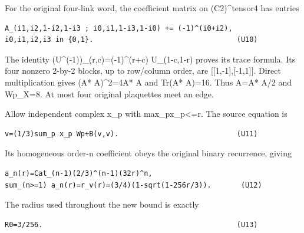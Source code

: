 \documentclass[11pt,a4paper]{article}
\renewcommand{\[}{\begingroup\small\originaldisplaystart}
\renewcommand{\]}{\originaldisplayend\endgroup}
\begin{document}
For the original four-link word, the coefficient matrix on
(C2)\^{}tensor4 has entries

\begin{verbatim}
A_(i1,i2,1-i2,1-i3 ; i0,i1,1-i3,1-i0) += (-1)^(i0+i2),
i0,i1,i2,i3 in {0,1}.                                  (U10)
\end{verbatim}

The identity
{(\allowbreak{}U\allowbreak{}\textasciicircum{}\allowbreak{}(\allowbreak{}-\allowbreak{}1\allowbreak{})\allowbreak{})\allowbreak{}\_\allowbreak{}(\allowbreak{}r\allowbreak{},\allowbreak{}c\allowbreak{})\allowbreak{}=\allowbreak{}(\allowbreak{}-\allowbreak{}1\allowbreak{})\allowbreak{}\textasciicircum{}\allowbreak{}(\allowbreak{}r\allowbreak{}+\allowbreak{}c\allowbreak{})\allowbreak{}}
U\_(1-c,1-r) proves its trace formula. Its four nonzero 2-by-2 blocks,
up to row/column order, are {[}{[}1,-1{]},{[}-1,1{]}{]}. Direct
multiplication gives (A* A)\^{}2=4A* A and Tr(A* A)=16. Thus
\textbar A\textbar=A* A/2 and \textbar\textbar Wp\textbar\textbar\_X=8.
At most four original plaquettes meet an edge.

Allow independent complex x\_p with
max\_p\textbar x\_p\textbar\textless=r. The source equation is

\begin{verbatim}
v=(1/3)sum_p x_p Wp+B(v,v).                            (U11)
\end{verbatim}

Its homogeneous order-n coefficient obeys the original binary
recurrence, giving

\begin{verbatim}
a_n(r)=Cat_(n-1)(2/3)^(n-1)(32r)^n,
sum_(n>=1) a_n(r)=r_v(r)=(3/4)(1-sqrt(1-256r/3)).       (U12)
\end{verbatim}

The radius used throughout the new bound is exactly

\begin{verbatim}
R0=3/256.                                              (U13)
\end{verbatim}
\end{document}
